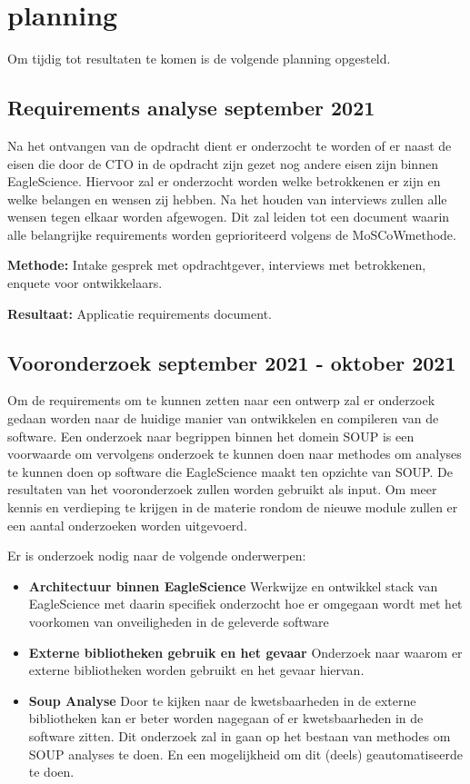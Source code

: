 \section{planning}\label{sec:planning}
Om tijdig tot resultaten te komen is de volgende planning opgesteld.

\subsection{Requirements analyse \textbf{september 2021}}\label{subsec:requirements-analyse}
Na het ontvangen van de opdracht dient er onderzocht te worden of er naast de eisen die door de CTO in de opdracht zijn gezet nog andere eisen zijn binnen EagleScience. Hiervoor zal er onderzocht worden welke betrokkenen er zijn en welke belangen en wensen zij hebben. Na het houden van interviews zullen alle wensen tegen elkaar worden afgewogen. Dit zal leiden tot een document waarin alle belangrijke requirements worden geprioriteerd volgens de MoSCoW\-methode.

\textbf{Methode:} Intake gesprek met opdrachtgever, interviews met betrokkenen, enquete voor ontwikkelaars.

\textbf{Resultaat:} Applicatie requirements document.

\subsection{Vooronderzoek \textbf{september 2021 - oktober 2021 }}\label{subsec:onderzoek}
Om de requirements om te kunnen zetten naar een ontwerp zal er onderzoek gedaan worden naar de huidige manier van ontwikkelen en compileren van de software. Een onderzoek naar begrippen binnen het domein SOUP is een voorwaarde om vervolgens onderzoek te kunnen doen naar methodes om analyses te kunnen doen op software die EagleScience maakt ten opzichte van SOUP. De resultaten van het vooronderzoek zullen worden gebruikt als input.
Om meer kennis en verdieping te krijgen in de materie rondom de nieuwe module zullen er een aantal onderzoeken worden uitgevoerd.


Er is onderzoek nodig naar de volgende onderwerpen:
\begin{itemize}
    \item \textbf{Architectuur binnen EagleScience} Werkwijze en ontwikkel stack van EagleScience met daarin specifiek onderzocht hoe er omgegaan wordt met het voorkomen van onveiligheden in de geleverde software
    \item \textbf{Externe bibliotheken gebruik en het gevaar} Onderzoek naar waarom er externe bibliotheken worden gebruikt en het gevaar hiervan.
    \item \textbf{Soup Analyse} Door te kijken naar de kwetsbaarheden in de externe bibliotheken kan er beter worden nagegaan of er kwetsbaarheden in de software zitten. Dit onderzoek zal in gaan op het bestaan van methodes om SOUP analyses te doen. En een mogelijkheid om dit (deels) geautomatiseerde te doen.
\end{itemize}

